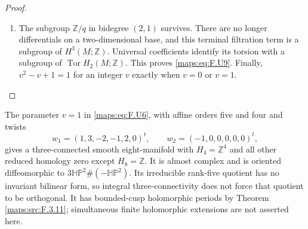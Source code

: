 \begin{proof}
\begin{enumerate}[label=\arabic*.]
\item The subgroup $\mathbb Z/q$ in bidegree $(2,1)$ survives.
There are no longer differentials on a two-dimensional base,
and this terminal filtration term is a subgroup of
$H^3(M;\mathbb Z)$.  Universal coefficients identify its
torsion with a subgroup of $\operatorname{Tor}H_2(M;\mathbb Z)$.
This proves \eqref{maps:eq:F.U9}.  Finally, $v^2-v+1=1$ for an integer $v$
exactly when $v=0$ or $v=1$.

\end{enumerate}
\end{proof}




\begin{theorem}\label{maps:src:F.2.18}


The parameter $v=1$ in \eqref{maps:eq:F.U6}, with affine orders five and four
and twists
\[
 w_1=(1,3,-2,-1,2,0)^t,\qquad
 w_2=(-1,0,0,0,0,0)^t,
\]
gives a three-connected smooth eight-manifold with
$H_4=\mathbb Z^4$ and all other reduced homology zero except
$H_8=\mathbb Z$.  It is almost complex and is oriented
diffeomorphic to $3\mathbb{HP}^2\#(-\mathbb{HP}^2)$.
Its irreducible rank-five quotient has no invariant bilinear
form, so integral three-connectivity does not force that
quotient to be orthogonal.  It has bounded-cusp holomorphic
periods by Theorem \ref{maps:src:F.3.11}; simultaneous finite holomorphic
extensions are not asserted here.

\end{theorem}


